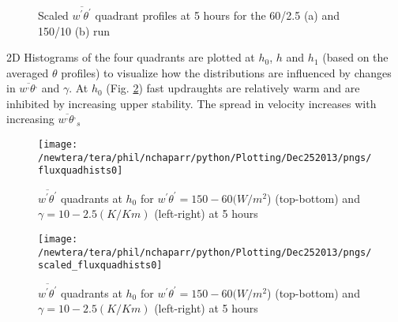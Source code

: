 \begin{figure}[htbp]
\begin{minipage}[b]{0.5\linewidth}        %
        \\
        \end{minipage}             
\quad
\begin{minipage}[b]{0.5\linewidth}
        \\
       \end{minipage}
        \caption{Scaled $\overline{w^{'} \theta^{'}}$ quadrant profiles at 5 hours for the 60/2.5 (a) and 150/10 (b) run}
        \label{fig:fluxqadprofs}
\end{figure}

2D Histograms of the four quadrants are plotted at $h_{0}$, $h$ and $h_{1}$ (based on the averaged $\theta$ profiles)
to visualize how the distributions are influenced by changes in $\overline{w^{,} \theta^{,}}$ and $\gamma$.  At $h_{0}$
(Fig. \ref{fig:fluxquadsh0}) fast updraughts are relatively warm and are inhibited by increasing upper stability.  The spread
in velocity increases with increasing $\overline{w^{,}\theta^{,}}_{s}$\\


\begin{figure}[htbp]
\centering
 \texttt{[image: /newtera/tera/phil/nchaparr/python/Plotting/Dec252013/pngs/fluxquadhists0]}                 
\label{fig:fluxquadsh0}
\caption{ $\overline{w^{'}\theta^{'}}$ quadrants at $h_{0}$ for $w^{'}\theta^{'} = 150 - 60 (W/m^{2}$) (top-bottom) and $\gamma = 10 - 2.5 (K/Km)$ (left-right) at 5 hours}
\end{figure}

\begin{figure}[htbp]
\centering
 \texttt{[image: /newtera/tera/phil/nchaparr/python/Plotting/Dec252013/pngs/scaled\_fluxquadhists0]}                 
\label{fig:scaled_fluxquadsh0}
\caption{ $\overline{w^{'}\theta^{'}}$ quadrants at $h_{0}$ for $w^{'}\theta^{'} = 150 - 60 (W/m^{2}$) (top-bottom) and $\gamma = 10 - 2.5 (K/Km)$ (left-right) at 5 hours}
\end{figure}


